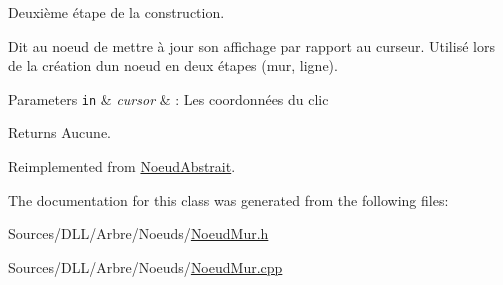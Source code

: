 Deuxième étape de la construction. 

Dit au noeud de mettre à jour son affichage par rapport au curseur. Utilisé lors de la création d\textquotesingle{}un noeud en deux étapes (mur, ligne).


\begin{DoxyParams}[1]{Parameters}
\mbox{\tt in}  & {\em cursor} & \+: Les coordonnées du clic\\
\hline
\end{DoxyParams}
\begin{DoxyReturn}{Returns}
Aucune. 
\end{DoxyReturn}


Reimplemented from \hyperlink{group__inf2990_ga233fd4600812176c557bb94ea04da5c9}{Noeud\+Abstrait}.



The documentation for this class was generated from the following files\+:\begin{DoxyCompactItemize}
\item 
Sources/\+D\+L\+L/\+Arbre/\+Noeuds/\hyperlink{_noeud_mur_8h}{Noeud\+Mur.\+h}\item 
Sources/\+D\+L\+L/\+Arbre/\+Noeuds/\hyperlink{_noeud_mur_8cpp}{Noeud\+Mur.\+cpp}\end{DoxyCompactItemize}
